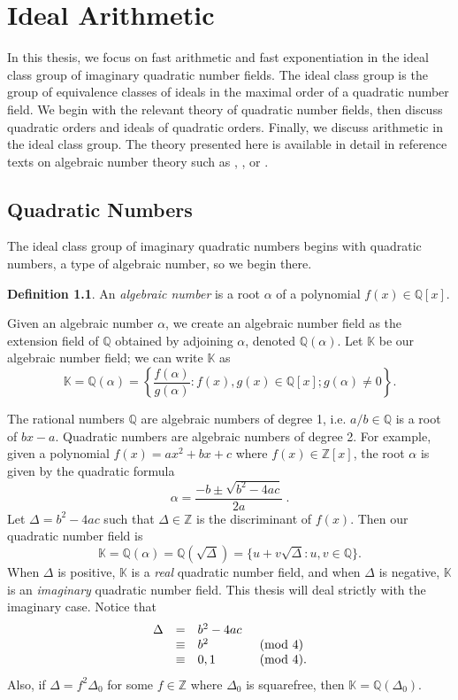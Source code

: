 \documentclass{ucalgthes1}
\theoremstyle{plain}
\theoremstyle{definition}
\newtheorem{defn}[thm]{Definition}
\newcommand{\KK}{\mathbb{K}}
\newcommand{\ZZ}{\mathbb{Z}}
\newcommand{\QQ}{\mathbb{Q}}
\begin{document}
\setcounter{chapter}{1}
\chapter{Ideal Arithmetic}

In this thesis, we focus on fast arithmetic and fast exponentiation in the ideal class group of imaginary quadratic number fields.  The ideal class group is the group of equivalence classes of ideals in the maximal order of a quadratic number field.   We begin with the relevant theory of quadratic number fields, then discuss quadratic orders and ideals of quadratic orders.  Finally, we discuss arithmetic in the ideal class group.  The theory presented here is available in detail in reference texts on algebraic number theory such as \cite{IR90}, \cite{Hua82}, or \cite{Coh80}. 



\section{Quadratic Numbers}

The ideal class group of imaginary quadratic numbers begins with quadratic numbers, a type of algebraic number, so we begin there.   

\begin{defn}
An \emph{algebraic number} is a root $\alpha$ of a polynomial $f(x) \in \QQ[x]$.
\end{defn}

\noindent
Given an algebraic number $\alpha$, we create an algebraic number field as the extension field of $\QQ$ obtained by adjoining $\alpha$, denoted $\QQ(\alpha)$. Let $\KK$ be our algebraic number field; we can write $\KK$ as
\[
	\KK = \QQ(\alpha) = \left\{ \frac{f(\alpha)}{g(\alpha)} : f(x), g(x) \in \QQ[x]; g(\alpha) \ne 0 \right\}.
\]

\noindent
The rational numbers $\QQ$ are algebraic numbers of degree 1, i.e. $a/b \in \QQ$ is a root of $bx - a$.  Quadratic numbers are algebraic numbers of degree 2.  For example, given a polynomial $f(x) = ax^2 + bx + c$ where $f(x) \in \ZZ[x]$, the root $\alpha$ is given by the quadratic formula
\[
	\alpha = \frac{-b \pm \sqrt{b^2 - 4ac}}{2a} ~.
\]
Let $\Delta = b^2 -4ac$ such that $\Delta \in \ZZ$ is the discriminant of $f(x)$.  Then our quadratic number field is 
\[
	\KK = \QQ(\alpha) = \QQ(\sqrt{\Delta}) = \{u + v\sqrt{\Delta} : u,v \in \QQ\}.
\]
When $\Delta$ is positive, $\KK$ is a \emph{real} quadratic number field, and when $\Delta$ is negative, $\KK$ is an \emph{imaginary} quadratic number field.  This thesis will deal strictly with the imaginary case.  Notice that
\begin{eqnarray*}
\begin{array}{l l l l}
	\Delta & = & b^2-4ac & \\
	& \equiv & b^2 & \pmod 4 \\
	& \equiv & 0,1 & \pmod 4.
\end{array}
\end{eqnarray*}
Also, if $\Delta = f^2 \Delta_0$ for some $f \in \ZZ$ where $\Delta_0$ is squarefree, then $\KK = \QQ(\Delta_0)$.
\end{document}
